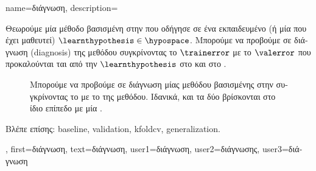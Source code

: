 {name={\foreignlanguage{greek}{διάγνωση}},
	description={\foreignlanguage{greek}{Θεωρούμε μία μέθοδο βασισμένη στην} 
		\foreignlanguage{greek}{που οδήγησε σε ένα εκπαιδευμένο}  
		(\foreignlanguage{greek}{ή μία}  \foreignlanguage{greek}{που έχει μαθευτεί}) $\learnthypothesis \in \hypospace$. 
		\foreignlanguage{greek}{Μπορούμε να προβούμε σε διάγνωση} (diagnosis) \foreignlanguage{greek}{της μεθόδου συγκρίνοντας το} 
		 $\trainerror$ \foreignlanguage{greek}{με το}  $\valerror$ 
		\foreignlanguage{greek}{που προκαλούνται ται από την $\learnthypothesis$ στο}  \foreignlanguage{greek}{και 
		στο} . 
		\begin{figure}[H]
			\begin{center}
			\end{center}
		{
		\caption{\foreignlanguage{greek}{Μπορούμε να προβούμε σε  διάγνωση μίας μεθόδου}  \foreignlanguage{greek}{βασισμένης 
			στην}  \foreignlanguage{greek}{συγκρίνοντας το}  \foreignlanguage{greek}{με το}
			 \foreignlanguage{greek}{της μεθόδου. Ιδανικά, και τα δύο βρίσκονται στο ίδιο επίπεδο με μία} 
			.\label{fig_diagnosis_dict}} }
		\end{figure}
		\foreignlanguage{greek}{Βλέπε επίσης:} \gls{baseline}, \gls{validation}, \gls{kfoldcv}, \gls{generalization}.},
	first={\foreignlanguage{greek}{διάγνωση}},
	text={\foreignlanguage{greek}{διάγνωση}},
	user1={\foreignlanguage{greek}{διάγνωση}}, %
  	user2={\foreignlanguage{greek}{διάγνωσης}}, %
	user3={\foreignlanguage{greek}{διάγνωση}} %
} 

